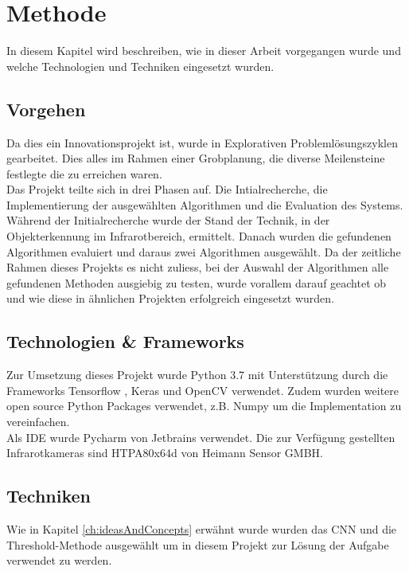 \chapter{Methode}

In diesem Kapitel wird beschreiben, wie in dieser Arbeit vorgegangen wurde und welche Technologien und Techniken eingesetzt wurden.


\section{Vorgehen}

Da dies ein Innovationsprojekt ist, wurde in Explorativen Problemlösungszyklen gearbeitet. Dies alles im Rahmen einer Grobplanung, die diverse Meilensteine festlegte die zu erreichen waren.\\
Das Projekt teilte sich in drei Phasen auf.  Die Intialrecherche, die Implementierung der ausgewählten Algorithmen und die Evaluation des Systems.\\
Während der Initialrecherche wurde der Stand der Technik, in der Objekterkennung im Infrarotbereich, ermittelt. Danach wurden die gefundenen Algorithmen evaluiert und daraus zwei Algorithmen ausgewählt. Da der zeitliche Rahmen dieses Projekts es nicht zuliess, bei der Auswahl der Algorithmen alle gefundenen Methoden ausgiebig zu testen, wurde vorallem darauf geachtet ob und wie diese in ähnlichen Projekten erfolgreich eingesetzt wurden.

\section{Technologien \& Frameworks}
Zur Umsetzung dieses Projekt wurde Python 3.7 mit Unterstützung durch die Frameworks Tensorflow \parencite{tensorflow2015}, Keras \parencite{keras} und OpenCV \parencite{opencv} verwendet. Zudem wurden weitere open source Python Packages verwendet, z.B. Numpy \parencite{numpy} um die Implementation zu vereinfachen.\\
Als \gls{IDE} wurde Pycharm von Jetbrains \parencite{pycharm} verwendet. Die zur Verfügung gestellten Infrarotkameras sind HTPA80x64d von Heimann Sensor GMBH.

\section{Techniken}

Wie in Kapitel \ref{ch:ideasAndConcepts} erwähnt wurde wurden das \gls{CNN} und die Threshold-Methode ausgewählt um in diesem Projekt zur Lösung der Aufgabe verwendet zu werden. 

